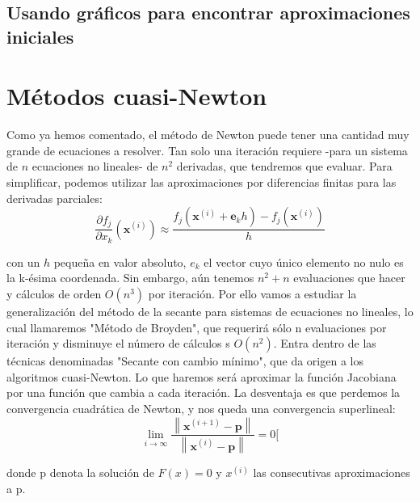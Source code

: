 \subsection{Usando gráficos para encontrar aproximaciones iniciales}


\section{Métodos cuasi-Newton}

Como ya hemos comentado, el método de Newton puede tener una cantidad muy grande de ecuaciones a resolver. Tan solo una iteración requiere -para un sistema de $n$ ecuaciones no lineales- de $n^2$ derivadas, que tendremos que evaluar.
Para simplificar, podemos utilizar las aproximaciones por diferencias finitas para las derivadas parciales:
\[\frac{\partial f_{j}}{\partial x_{k}}\left(\mathbf{x}^{(i)}\right) \approx \frac{f_{j}\left(\mathbf{x}^{(i)}+\mathbf{e}_{k} h\right)-f_{j}\left(\mathbf{x}^{(i)}\right)}{h}\]

con un $h$ pequeña en valor absoluto, $e_k$ el vector cuyo único elemento no nulo es la k-ésima coordenada.
Sin embargo, aún tenemos $n^2 + n$ evaluaciones que hacer y cálculos de orden $O(n^3)$ por iteración.
Por ello vamos a estudiar la generalización del método de la secante para sistemas de ecuaciones no lineales, lo cual llamaremos "Método de Broyden", que requerirá sólo n evaluaciones por iteración y disminuye el número de cálculos s $O(n^2)$. Entra dentro de las técnicas denominadas "Secante con cambio mínimo", que da origen a los algoritmos cuasi-Newton.
Lo que haremos será aproximar la función Jacobiana por una función que cambia a cada iteración. La desventaja es que perdemos la convergencia cuadrática de Newton, y nos queda una convergencia superlineal:
\[\lim _{i \rightarrow \infty} \frac{\left\|\mathbf{x}^{(i+1)}-\mathbf{p}\right\|}{\left\|\mathbf{x}^{(i)}-\mathbf{p}\right\|}=0[\]

donde p denota la solución de $F(x) = 0$ y $x^(i)$ las consecutivas aproximaciones a p.


